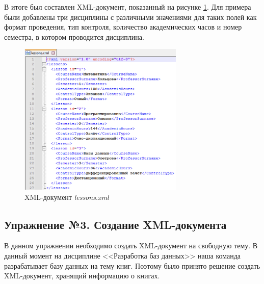 \documentclass[a4paper, 14pt]{extarticle}
\begin{document}
В итоге был составлен XML-документ, показанный на рисунке \ref{fig:task-2:1}.
Для примера были добавлены три дисциплины с различными значениями для таких
полей как формат проведения, тип контроля, количество академических часов и
номер семестра, в котором проводится дисциплина.

\begin{figure}[H]
  \centering
  \includegraphics[width=0.7\textwidth]{images/task-2/1.png}
  \caption{XML-документ \textit{\foreignlanguage{english}{lessons.xml}}}
  \label{fig:task-2:1}
\end{figure}

\subsection*{Упражнение №3. Создание XML-документа}

В данном упражнении необходимо создать XML-документ на свободную тему. В данный
момент на дисциплине <<Разработка баз данных>> наша команда разрабатывает базу
данных на тему книг. Поэтому было принято решение создать XML-документ, хранящий
информацию о книгах.
\end{document}
